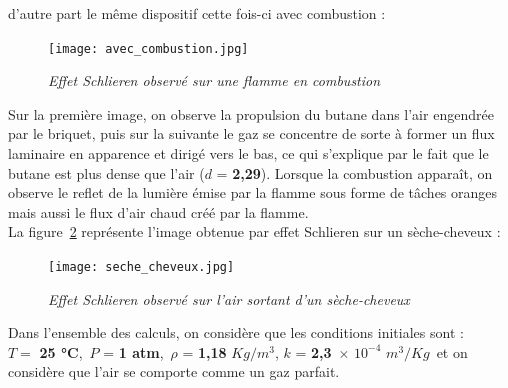 d'autre part le même dispositif cette fois-ci avec combustion :\\
\begin{figure}[H]
	\centering
	\texttt{[image: avec\_combustion.jpg]}
	\caption{\small{\textit{Effet Schlieren observé sur une flamme en combustion}}}
	\label{fig:avec_combustion}
\end{figure}
Sur la première image, on observe la propulsion du butane dans l’air engendrée par le briquet, puis sur la suivante le gaz se concentre de sorte à former un flux laminaire en apparence et dirigé vers le bas, ce qui s’explique par le fait que le butane est plus dense que l’air ($d$ = \textbf{2,29}). Lorsque la combustion apparaît, on observe le reflet de la lumière émise par la flamme sous forme de tâches oranges mais aussi le flux d’air chaud créé par la flamme. \\
La figure~\ref{fig:seche_cheveux} représente l'image obtenue par effet Schlieren sur un sèche-cheveux :
\begin{figure}[H]
	\centering
	\texttt{[image: seche\_cheveux.jpg]}
	\caption{\small{\textit{Effet Schlieren observé sur l'air sortant d'un sèche-cheveux}}}
	\label{fig:seche_cheveux}
\end{figure}
Dans l’ensemble des calculs, on considère que les conditions initiales sont : \\
$T =$ \textbf{25 °C}, \,$P$ = \textbf{1 atm}, \,$\rho$ = \textbf{1,18} $Kg/m^{3}$, $k$ = \textbf{2,3}$\,\,\times\,10^{-4}\,\,m^{3}/Kg\,$ et on considère que l'air se comporte comme un gaz parfait.\\

